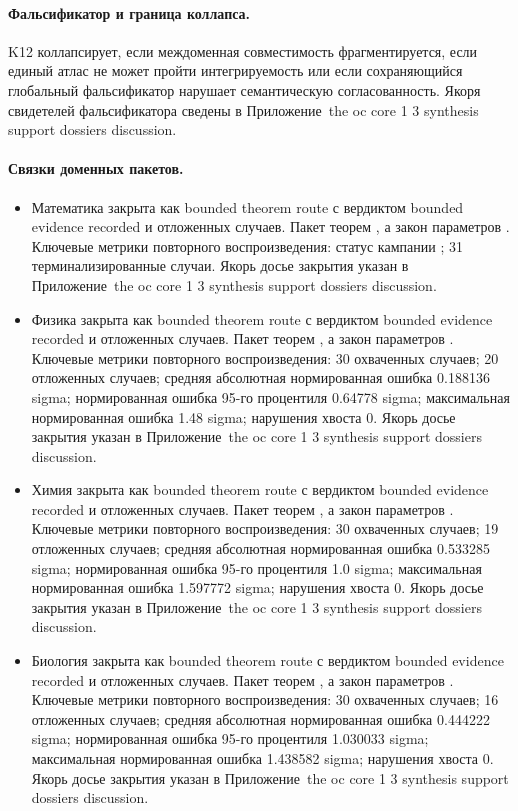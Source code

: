 \paragraph{Фальсификатор и граница коллапса.}
K12 коллапсирует, если междоменная совместимость фрагментируется, если единый атлас не может пройти интегрируемость или если сохраняющийся глобальный фальсификатор нарушает семантическую согласованность.
Якоря свидетелей фальсификатора сведены в Приложение~the oc core 1 3 synthesis support dossiers discussion.

\paragraph{Связки доменных пакетов.}
\begin{itemize}[leftmargin=1.6em,nosep]
\item Математика закрыта как bounded theorem route с вердиктом bounded evidence recorded и  отложенных случаев. Пакет теорем , а закон параметров . Ключевые метрики повторного воспроизведения: статус кампании ; 31 терминализированные случаи. Якорь досье закрытия указан в Приложение~the oc core 1 3 synthesis support dossiers discussion.
\item Физика закрыта как bounded theorem route с вердиктом bounded evidence recorded и  отложенных случаев. Пакет теорем , а закон параметров . Ключевые метрики повторного воспроизведения: 30 охваченных случаев; 20 отложенных случаев; средняя абсолютная нормированная ошибка 0.188136 sigma; нормированная ошибка 95-го процентиля 0.64778 sigma; максимальная нормированная ошибка 1.48 sigma; нарушения хвоста 0. Якорь досье закрытия указан в Приложение~the oc core 1 3 synthesis support dossiers discussion.
\item Химия закрыта как bounded theorem route с вердиктом bounded evidence recorded и  отложенных случаев. Пакет теорем , а закон параметров . Ключевые метрики повторного воспроизведения: 30 охваченных случаев; 19 отложенных случаев; средняя абсолютная нормированная ошибка 0.533285 sigma; нормированная ошибка 95-го процентиля 1.0 sigma; максимальная нормированная ошибка 1.597772 sigma; нарушения хвоста 0. Якорь досье закрытия указан в Приложение~the oc core 1 3 synthesis support dossiers discussion.
\item Биология закрыта как bounded theorem route с вердиктом bounded evidence recorded и  отложенных случаев. Пакет теорем , а закон параметров . Ключевые метрики повторного воспроизведения: 30 охваченных случаев; 16 отложенных случаев; средняя абсолютная нормированная ошибка 0.444222 sigma; нормированная ошибка 95-го процентиля 1.030033 sigma; максимальная нормированная ошибка 1.438582 sigma; нарушения хвоста 0. Якорь досье закрытия указан в Приложение~the oc core 1 3 synthesis support dossiers discussion.

\end{itemize}
